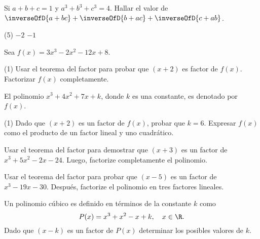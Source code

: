 \begin{multicols}{2}
    \begin{exercise}
        Si $a + b + c = 1$ y $a^3 + b^3 + c^3 = 4$.
        Hallar el valor de $\inverseOfD{a + bc} + \inverseOfD{b + ac} + \inverseOfD{c + ab}$.
        \begin{tasks}(5)
            \task $-2$
            \task $-1$
        \end{tasks}
    \end{exercise}

    \begin{exercise}
        Sea $f(x) = 3x^3 - 2x^2 - 12x + 8$.
        \begin{tasks}[label=\alph*.](1)
            \task Usar el teorema del factor para probar que $(x + 2)$ es factor de $f(x)$.
            \task Factorizar $f(x)$ completamente.
        \end{tasks}
    \end{exercise}

    \begin{exercise}
        El polinomio $x^3 + 4x^2 + 7x + k$, donde $k$ es una constante, es denotado por $f(x)$.
        \begin{tasks}[label=\alph*.](1)
            \task Dado que $(x + 2)$ es un factor de $f(x)$, probar que $k = 6$.
            \task Expresar $f(x)$ como el producto de un factor lineal y uno cuadrático.
        \end{tasks}
    \end{exercise}

    \begin{exercise}
        Usar el teorema del factor para demostrar que $(x + 3)$ es un factor de $x^3 + 5x^2 - 2x - 24$.
        Luego, factorize completamente el polinomio.
    \end{exercise}

    \begin{exercise}
        Usar el teorema del factor para probar que $(x - 5)$ es un factor de $x^3 - 19x - 30$.
        Después, factorize el polinomio en tres factores lineales.
    \end{exercise}

    \begin{exercise}
        Un polinomio cúbico es definido en términos de la constante $k$ como
        \[
            P(x) = x^3 + x^2 - x + k,\quad x \in \R.
        \]
        Dado que $(x - k)$ es un factor de $P(x)$ determinar los posibles valores de $k$.
    \end{exercise}


\end{multicols}

